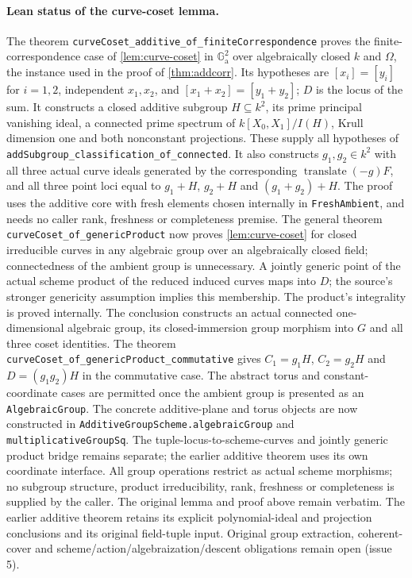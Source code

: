 \documentclass[11pt,oneside]{article}
\theoremstyle{definition}
\theoremstyle{remark}
\newcommand{\Ga}{\mathbb G_{\mathrm a}}
\newcommand{\lean}[1]{\nolinkurl{#1}}
\begin{document}
\paragraph{Lean status of the curve-coset lemma.}
The theorem \lean{curveCoset_additive_of_finiteCorrespondence} proves the finite-correspondence
case of \cref{lem:curve-coset} in $\Ga^2$ over algebraically closed $k$ and $\Omega$, the
instance used in the proof of \cref{thm:addcorr}. Its hypotheses are $[x_i]=[y_i]$ for
$i=1,2$, independent $x_1,x_2$, and $[x_1+x_2]=[y_1+y_2]$; $D$ is the locus of the sum.
It constructs a closed additive subgroup $H\subseteq k^2$, its prime principal vanishing
ideal, a connected prime spectrum of $k[X_0,X_1]/I(H)$, Krull dimension one and both
nonconstant projections. These supply all hypotheses of
\lean{addSubgroup_classification_of_connected}. It also constructs $g_1,g_2\in k^2$
with all three actual curve ideals generated by the corresponding
$\operatorname{translate}(-g)F$, and all three point loci equal to $g_1+H$, $g_2+H$ and
$(g_1+g_2)+H$. The proof uses the additive core with fresh elements chosen internally in
\lean{FreshAmbient}, and needs no caller rank, freshness or completeness premise.
The general theorem \lean{curveCoset_of_genericProduct} now proves
\cref{lem:curve-coset} for closed irreducible curves in any algebraic group over an
algebraically closed field; connectedness of the ambient group is unnecessary. A jointly
generic point of the actual scheme product of the reduced induced curves maps into $D$;
the source's stronger genericity assumption implies this membership. The product's
integrality is proved internally. The conclusion constructs an actual connected
one-dimensional algebraic group, its closed-immersion group morphism into $G$ and all
three coset identities. The theorem \lean{curveCoset_of_genericProduct_commutative}
gives $C_1=g_1H$, $C_2=g_2H$ and $D=(g_1g_2)H$ in the commutative case. The abstract
torus and constant-coordinate cases are permitted once the ambient group is presented
as an \lean{AlgebraicGroup}. The concrete additive-plane and torus objects are now
constructed in \lean{AdditiveGroupScheme.algebraicGroup} and \lean{multiplicativeGroupSq}.
The tuple-locus-to-scheme-curves and jointly generic product bridge remains separate;
the earlier additive theorem uses its own coordinate interface. All group operations restrict
as actual scheme morphisms; no subgroup structure, product irreducibility, rank,
freshness or completeness is supplied by the caller. The original lemma and proof above
remain verbatim. The earlier additive theorem retains its explicit polynomial-ideal and
projection conclusions and its original field-tuple input. Original group extraction,
coherent-cover and scheme/action/algebraization/descent obligations remain open (issue 5).
\end{document}
